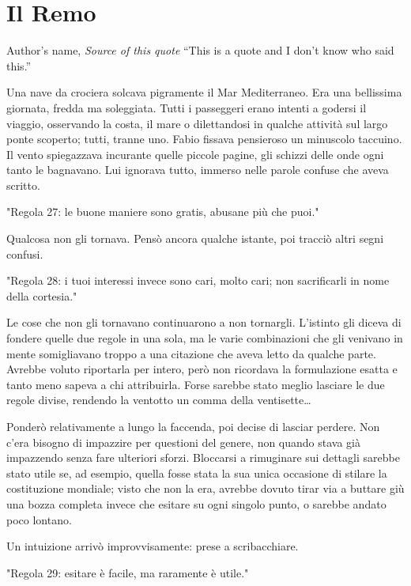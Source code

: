 \chapter{Il Remo}

\begin{chapquote}{Author's name, \textit{Source of this quote}}
``This is a quote and I don't know who said this.''
\end{chapquote}


Una nave da crociera solcava pigramente il Mar Mediterraneo. Era una bellissima giornata, fredda ma soleggiata. Tutti i passeggeri erano intenti a godersi il viaggio, osservando la costa, il mare o dilettandosi in qualche attività sul largo ponte scoperto; tutti, tranne uno. Fabio fissava pensieroso un minuscolo taccuino. Il vento spiegazzava incurante quelle piccole pagine, gli schizzi delle onde ogni tanto le bagnavano. Lui ignorava tutto, immerso nelle parole confuse che aveva scritto.

"Regola 27: le buone maniere sono gratis, abusane più che puoi."

Qualcosa non gli tornava. Pensò ancora qualche istante, poi tracciò altri segni confusi.

"Regola 28: i tuoi interessi invece sono cari, molto cari; non sacrificarli in nome della cortesia."

Le cose che non gli tornavano continuarono a non tornargli. L'istinto gli diceva di fondere quelle due regole in una sola, ma le varie combinazioni che gli venivano in mente somigliavano troppo a una citazione che aveva letto da qualche parte. Avrebbe voluto riportarla per intero, però non ricordava la formulazione esatta e tanto meno sapeva a chi attribuirla. Forse sarebbe stato meglio lasciare le due regole divise, rendendo la ventotto un comma della ventisette\ldots

Ponderò relativamente a lungo la faccenda, poi decise di lasciar perdere. Non c'era bisogno di impazzire per questioni del genere, non quando stava già impazzendo senza fare ulteriori sforzi. Bloccarsi a rimuginare sui dettagli sarebbe stato utile se, ad esempio, quella fosse stata la sua unica occasione di stilare la costituzione mondiale; visto che non la era, avrebbe dovuto tirar via a buttare giù una bozza completa invece che esitare su ogni singolo punto, o sarebbe andato poco lontano. 

Un intuizione arrivò improvvisamente: prese a scribacchiare.

"Regola 29: esitare è facile, ma raramente è utile."

